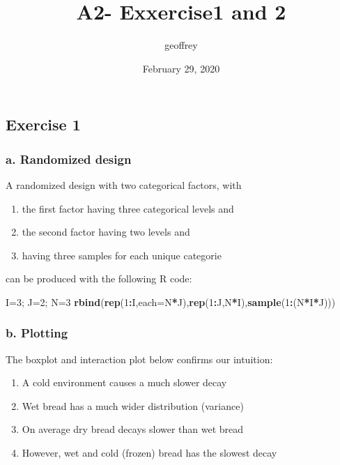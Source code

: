 \documentclass[]{article}
\title{A2- Exxercise1 and 2}
\author{geoffrey}
\date{February 29, 2020}
\newenvironment{Shaded}{\begin{snugshade}}{\end{snugshade}}
\newcommand{\DataTypeTok}[1]{\textcolor[rgb]{0.13,0.29,0.53}{#1}}
\newcommand{\DecValTok}[1]{\textcolor[rgb]{0.00,0.00,0.81}{#1}}
\newcommand{\KeywordTok}[1]{\textcolor[rgb]{0.13,0.29,0.53}{\textbf{#1}}}
\newcommand{\NormalTok}[1]{#1}
\newcommand{\OperatorTok}[1]{\textcolor[rgb]{0.81,0.36,0.00}{\textbf{#1}}}
\providecommand{\tightlist}{%
  \setlength{\itemsep}{0pt}\setlength{\parskip}{0pt}}
\begin{document}
\maketitle

\hypertarget{exercise-1}{%
\subsection{Exercise 1}\label{exercise-1}}

\hypertarget{a.-randomized-design}{%
\subsubsection{a. Randomized design}\label{a.-randomized-design}}

A randomized design with two categorical factors, with

\begin{enumerate}
\def\labelenumi{\arabic{enumi}.}
\tightlist
\item
  the first factor having three categorical levels and
\item
  the second factor having two levels and
\item
  having three samples for each unique categorie
\end{enumerate}

can be produced with the following R code:

\begin{Shaded}
\begin{Highlighting}[]
\NormalTok{I=}\DecValTok{3}\NormalTok{; J=}\DecValTok{2}\NormalTok{; N=}\DecValTok{3}
\KeywordTok{rbind}\NormalTok{(}\KeywordTok{rep}\NormalTok{(}\DecValTok{1}\OperatorTok{:}\NormalTok{I,}\DataTypeTok{each=}\NormalTok{N}\OperatorTok{*}\NormalTok{J),}\KeywordTok{rep}\NormalTok{(}\DecValTok{1}\OperatorTok{:}\NormalTok{J,N}\OperatorTok{*}\NormalTok{I),}\KeywordTok{sample}\NormalTok{(}\DecValTok{1}\OperatorTok{:}\NormalTok{(N}\OperatorTok{*}\NormalTok{I}\OperatorTok{*}\NormalTok{J)))}
\end{Highlighting}
\end{Shaded}

\hypertarget{b.-plotting}{%
\subsubsection{b. Plotting}\label{b.-plotting}}

The boxplot and interaction plot below confirms our intuition:

\begin{enumerate}
\def\labelenumi{\arabic{enumi}.}
\tightlist
\item
  A cold environment causes a much slower decay
\item
  Wet bread has a much wider distribution (variance)
\item
  On average dry bread decays slower than wet bread
\item
  However, wet and cold (frozen) bread has the slowest decay
\end{enumerate}
\end{document}
